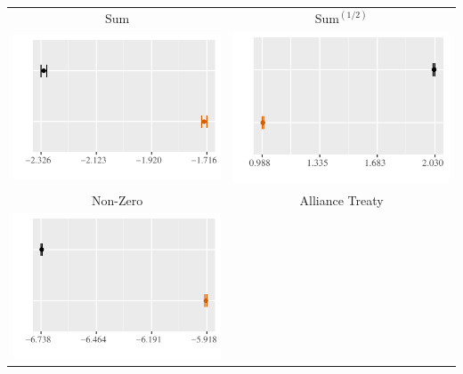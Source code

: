 \documentclass[reqno,onecolumn,letterpaper,12pt]{article}
\begin{document}
\clearpage
\begin{longtable}[!h]{c@{\hskip 0cm}c}
Sum & Sum$^{(1/2)}$ \\
\includegraphics[height=.18\textheight, clip=true, trim=0cm 0cm 0cm .2cm]{draft_figures/plots_pooled/Sum.pdf}    &
\includegraphics[height=.18\textheight, clip=true, trim=0cm 0cm 0cm .2cm]{draft_figures/plots_pooled/sum_5.pdf}   \\
Non-Zero & Alliance Treaty\\
\includegraphics[height=.18\textheight, clip=true, trim=0cm 0cm 0cm .2cm]{draft_figures/plots_pooled/Non-zero.pdf} &

\end{longtable}
\end{document}
